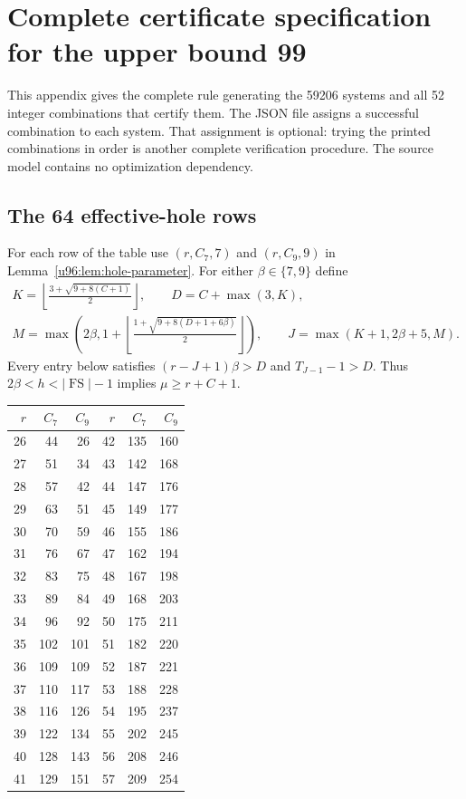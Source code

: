 \documentclass[11pt,a4paper]{article}
\theoremstyle{remark}
\newcommand{\FS}{\operatorname{FS}}
\begin{document}
\clearpage
\section[Certificate specification for upper bound 99]{Complete certificate specification for the upper bound 99}\label{u96:app:upper99}
This appendix gives the complete rule generating the 59206 systems and
all 52 integer combinations that certify them. The JSON file assigns a
successful combination to each system. That assignment is optional:
trying the printed combinations in order is another complete verification
procedure. The source model contains no optimization dependency.

\subsection{The 64 effective-hole rows}
For each row of the table use $(r,C_7,7)$ and $(r,C_9,9)$ in
Lemma~\ref{u96:lem:hole-parameter}. For either $\beta\in\{7,9\}$ define
\[
\begin{gathered}
 K=\left\lfloor\frac{3+\sqrt{9+8(C+1)}}2\right\rfloor,
 \qquad D=C+\max(3,K),\\
 M=\max\left(2\beta,1+\left\lfloor
       \frac{1+\sqrt{9+8(D+1+6\beta)}}2\right\rfloor\right),
 \qquad J=\max(K+1,2\beta+5,M).
\end{gathered}
\]
Every entry below satisfies $(r-J+1)\beta>D$ and $T_{J-1}-1>D$.
Thus $2\beta<h<|\FS|-1$ implies $\mu\geq r+C+1$.
\begin{center}\small
\begin{tabular}{rrr@{\qquad}rrr}
\toprule
$r$&$C_7$&$C_9$&$r$&$C_7$&$C_9$\\
\midrule
26&44&26&42&135&160\\
27&51&34&43&142&168\\
28&57&42&44&147&176\\
29&63&51&45&149&177\\
30&70&59&46&155&186\\
31&76&67&47&162&194\\
32&83&75&48&167&198\\
33&89&84&49&168&203\\
34&96&92&50&175&211\\
35&102&101&51&182&220\\
36&109&109&52&187&221\\
37&110&117&53&188&228\\
38&116&126&54&195&237\\
39&122&134&55&202&245\\
40&128&143&56&208&246\\
41&129&151&57&209&254\\
\bottomrule
\end{tabular}
\end{center}
\end{document}
